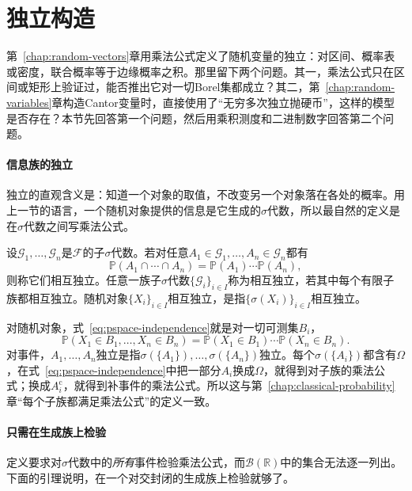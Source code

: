 \section{独立构造}
\label{sec:pspace-independence}

第~\ref{chap:random-vectors}章用乘法公式定义了随机变量的独立：对区间、概率表或密度，联合概率等于边缘概率之积。那里留下两个问题。其一，乘法公式只在区间或矩形上验证过，能否推出它对一切Borel集都成立？其二，第~\ref{chap:random-variables}章构造Cantor变量时，直接使用了“无穷多次独立抛硬币”，这样的模型是否存在？本节先回答第一个问题，然后用乘积测度和二进制数字回答第二个问题。

\paragraph{信息族的独立}
独立的直观含义是：知道一个对象的取值，不改变另一个对象落在各处的概率。用上一节的语言，一个随机对象提供的信息是它生成的$\sigma$代数，所以最自然的定义是在$\sigma$代数之间写乘法公式。

\begin{definition}[独立]
\label{def:pspace-independence}
设$\mathcal{G}_1,\dots,\mathcal{G}_n$是$\mathcal{F}$的子$\sigma$代数。若对任意$A_1\in\mathcal{G}_1,\dots,A_n\in\mathcal{G}_n$都有
\begin{equation}
  \mathbb{P}(A_1\cap\cdots\cap A_n)=\mathbb{P}(A_1)\cdots\mathbb{P}(A_n),
  \label{eq:pspace-independence}
\end{equation}
则称它们相互独立。任意一族子$\sigma$代数$\{\mathcal{G}_i\}_{i\in I}$称为相互独立，若其中每个有限子族都相互独立。随机对象$\{X_i\}_{i\in I}$相互独立，是指$\{\sigma(X_i)\}_{i\in I}$相互独立。
\end{definition}

对随机对象，式~\eqref{eq:pspace-independence}就是对一切可测集$B_i$，
\[
  \mathbb{P}(X_1\in B_1,\dots,X_n\in B_n)=\mathbb{P}(X_1\in B_1)\cdots\mathbb{P}(X_n\in B_n).
\]
对事件，$A_1,\dots,A_n$独立是指$\sigma(\{A_1\}),\dots,\sigma(\{A_n\})$独立。每个$\sigma(\{A_i\})$都含有$\Omega$，在式~\eqref{eq:pspace-independence}中把一部分$A_i$换成$\Omega$，就得到对子族的乘法公式；换成$A_i^{\mathrm{c}}$，就得到补事件的乘法公式。所以这与第~\ref{chap:classical-probability}章“每个子族都满足乘法公式”的定义一致。

\paragraph{只需在生成族上检验}
定义要求对$\sigma$代数中的\emph{所有}事件检验乘法公式，而$\mathcal{B}(\mathbb{R})$中的集合无法逐一列出。下面的引理说明，在一个对交封闭的生成族上检验就够了。


